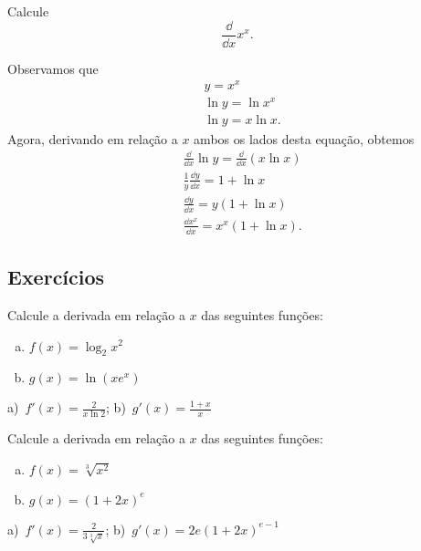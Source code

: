 \begin{exeresol}
  Calcule
  \begin{equation}
    \frac{\dd}{\dd x}x^x.
  \end{equation}
\end{exeresol}
\begin{resol}
  Observamos que
  \begin{align}
    & y = x^x \\
    & \ln y = \ln x^x \\
    & \ln y = x\ln x.
  \end{align}
  Agora, derivando em relação a $x$ ambos os lados desta equação, obtemos
  \begin{align}
    & \frac{\dd}{\dd x}\ln y = \frac{\dd}{\dd x}\left(x\ln x\right) \\
    & \frac{1}{y}\frac{\dd y}{\dd x} = 1 + \ln x \\
    & \frac{\dd y}{\dd x} = y(1 + \ln x) \\
    & \frac{\dd x^x}{\dd x} = x^x(1 + \ln x).
  \end{align}
\end{resol}

\subsection{Exercícios}

\begin{exer}
  Calcule a derivada em relação a $x$ das seguintes funções:
  \begin{enumerate}[a)]
  \item $f(x) = \log_2 x^2$
  \item $g(x) = \ln (xe^x)$
  \end{enumerate}
\end{exer}
\begin{resp}
  a)~$\displaystyle f'(x) = \frac{2}{x\ln 2}$; b)~$g'(x) = \frac{1+x}{x}$
\end{resp}

\begin{exer}
  Calcule a derivada em relação a $x$ das seguintes funções:
  \begin{enumerate}[a)]
  \item $f(x) = \sqrt[3]{x^2}$
  \item $g(x) = (1+2x)^e$
  \end{enumerate}
\end{exer}
\begin{resp}
  a)~$\displaystyle f'(x) = \frac{2}{3\sqrt[3]{x}}$; b)~$g'(x) = 2e(1+2x)^{e-1}$
\end{resp}

